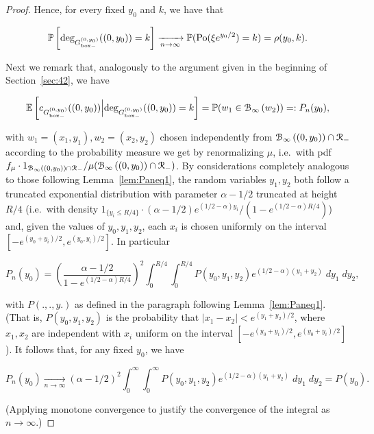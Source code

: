 \begin{proof}
\noindent
Hence, for every fixed $y_0$ and $k$, we have that 

$$ \Pee\left[ \text{deg}_{\GboxH^{(0,y_0)}}((0,y_0))=k\right] %
\xrightarrow[n\to\infty]{} 
\Pee( \Po(\xi e^{y_0/2})=k ) = \rho(y_0,k).$$


Next we remark that, analogously to the argument given in the beginning of Section~\ref{sec:42}, we have

$$ %
\Ee\left[ c_{\GboxH^{(0,y_0)}}((0,y_0)) {\Big|} \text{deg}_{\GboxH^{(0,y_0)}}((0,y_0))=k \right] 
= \Pee( w_1 \in \BallPo{w_2} ) =: P_n(y_0), $$

\noindent
with $w_1 = (x_1, y_1), w_2 = (x_2, y_2)$ chosen independently from ${\mathcal B}_{\infty}\left((0,y_0)\right) \cap {\mathcal R}_-$ according to the probability 
measure we get by renormalizing $\mu$, i.e.~with pdf $f_\mu \cdot 1_{{\mathcal B}_{\infty}\left((0,y_0)\right) \cap {\mathcal R}_-} / \mu({\mathcal B}_{\infty}\left((0,y_0)\right)\cap {\mathcal R}_-)$.
By considerations completely analogous to those following Lemma~\ref{lem:Paneq1}, the random variables $y_1, y_2$ both follow
a truncated exponential distribution with parameter $\alpha - 1/2$ truncated at height $R/4$
(i.e.~with density $1_{\{y_i \leq R/4\}} \cdot (\alpha-1/2) e^{(1/2-\alpha)y_i} / (1-e^{(1/2-\alpha)R/4})$) and, given the 
values of $y_0, y_1, y_2$, each $x_i$ is chosen uniformly on the interval $[-e^{(y_0+y_i)/2}, e^{(y_0,y_i)/2}]$.
In particular

$$ P_n(y_0) = 
\left(\frac{\alpha-1/2}{1-e^{(1/2-\alpha)R/4}}\right)^2 \int_0^{R/4}\int_0^{R/4} P(y_0, y_1, y_2) e^{(1/2-\alpha)(y_1+y_2)}\;dy_1\;dy_2,
$$

\noindent
with $P(.,.,y.)$ as defined in the paragraph following Lemma~\ref{lem:Paneq1}.
(That is, $P(y_0, y_1, y_2)$ is the probability that $|x_1-x_2| < e^{(y_1+y_2)/2}$, where $x_1, x_2$ are independent with $x_i$ uniform 
on the interval $[-e^{(y_0+y_i)/2}, e^{(y_0+y_i)/2}]$). 
It follows that, for any fixed $y_0$, we have

$$ P_n(y_0) \xrightarrow[n\to\infty]{} 
(\alpha-1/2)^2\int_0^\infty\int_0^\infty P(y_0, y_1, y_2) e^{(1/2-\alpha)(y_1+y_2)}\;dy_1\;dy_2 = P(y_0). $$

\noindent
(Applying monotone convergence to justify the convergence of the integral as $n \to \infty$.) 


\end{proof}
